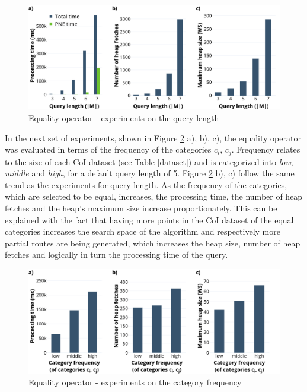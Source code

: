\begin{figure}[H]
	\includegraphics[scale=0.33]{images/eo_length.png}
	\centering
	\caption{Equality operator - experiments on the query length}
	\label{fig:eo_length}
\end{figure}

In the next set of experiments, shown in Figure \ref{fig:eo_frequency} a), b), c), the equality operator was evaluated in terms of the frequency of the categories $c_i$, $c_j$. Frequency relates to the size of each CoI dataset (see Table \ref{dataset}) and is categorized into \textit{low}, \textit{middle} and \textit{high}, for a default query length of 5.  Figure \ref{fig:eo_frequency} b), c) follow the same trend as the experiments for query length. 
As the frequency of the categories, which are selected to be equal, increases, the processing time, the number of heap fetches and the heap's maximum size increase proportionately. This can be explained with the fact that having more points in the CoI dataset of the equal categories increases the search space of the algorithm and respectively more partial routes are being generated, which increases the heap size, number of heap fetches and logically in turn the processing time of the query.

\begin{figure}[H]
	\includegraphics[scale=0.33]{images/eo_frequency.png}
	\centering
	\caption{Equality operator - experiments on the category frequency}
	\label{fig:eo_frequency}
\end{figure}

